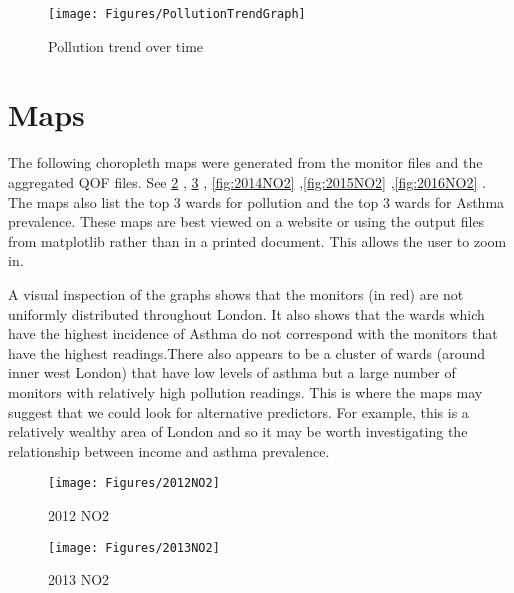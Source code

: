\begin{figure}
\centering
\texttt{[image: Figures/PollutionTrendGraph]}
\decoRule
\caption[Pollution trend]{Pollution trend over time}
\label{fig:PollutionTrend}
\end{figure}

\section{Maps}
The following choropleth maps were generated from the monitor files and the aggregated QOF files. 
See  \ref{fig:2012NO2} , \ref{fig:2013NO2} , \ref{fig:2014NO2} ,\ref{fig:2015NO2} ,\ref{fig:2016NO2} .
The maps also list the top 3 wards for pollution and the top 3 wards for Asthma prevalence. These maps are best viewed on a website or using the output files from matplotlib rather than in a printed document. This allows the user to zoom in.

A visual inspection of the graphs shows that the monitors (in red) are not uniformly distributed throughout London. It also shows that the wards which have the highest incidence of Asthma do not correspond with the monitors that have the highest readings.There also appears to be a cluster of wards (around inner west London) that have low levels of asthma but a large number of monitors with relatively high pollution readings. This is where the maps may suggest that we could look for alternative predictors. For example, this is a relatively wealthy area of London and so it may be worth investigating the relationship between income and asthma prevalence.



\begin{figure}[]
	\centering
	\hspace*{-2cm}\texttt{[image: Figures/2012NO2]}
	
	\caption[2012NO2]{2012 NO2}
	\label{fig:2012NO2}
\end{figure}
\begin{figure}[]
	\centering
	\hspace*{-2cm}\texttt{[image: Figures/2013NO2]}
	
	\caption[2013NO2]{2013 NO2}
	\label{fig:2013NO2}
\end{figure}

